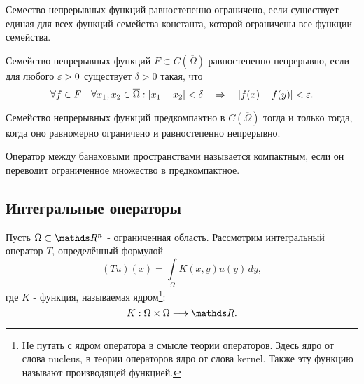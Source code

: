 \begin{definition}
Семество непрерывных функций равностепенно ограничено, если существует единая для всех функций семейства константа, которой ограничены все функции семейства.
\end{definition}

\begin{definition}
Семейство непрерывных функций $F \subset C(\overline{\Omega})$ равностепенно непрерывно, если для любого $\varepsilon >0$  существует $\delta >0$ такая, что
$$ \forall f \in F \quad \forall x_1,x_2 \in \overline{\Omega} : | x_1 - x_2 | < \delta \quad \Rightarrow \quad |f(x) - f(y)| < \varepsilon .$$ 
\end{definition}

\begin{theorem}
Семейство непрерывных функций предкомпактно в $C(\overline{\Omega})$ тогда и только тогда, когда оно равномерно ограничено и равностепенно непрерывно.
\end{theorem}

\begin{definition}
Оператор между банаховыми пространствами называется компактным, если он переводит ограниченное множество в предкомпактное.
\end{definition}

\subsection{Интегральные операторы}
Пусть $\Omega \subset \real^n$ - ограниченная область.
Рассмотрим интегральный оператор $T$, определённый формулой
$$ (Tu)(x) = \int \limits_\Omega K(x,y) u(y) \, dy,$$
где $K$ - функция, называемая ядром\footnote{Не путать с ядром оператора в смысле теории операторов. Здесь ядро от слова nucleus, в теории операторов ядро от слова kernel. Также эту функцию называют производящей функцией.}:
$$ K : \Omega \times \Omega \longrightarrow \real.$$

